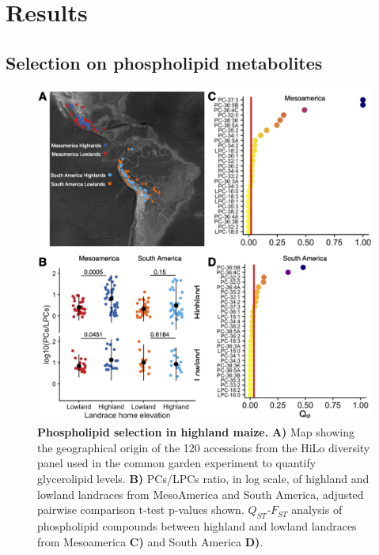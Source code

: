 \documentclass[9pt,twocolumn,twoside,lineno]{BioRxiv}
\begin{document}
\section{Results}
\label{sec:results}
\subsection{Selection on phospholipid metabolites}
\begin{figure}[hbp]
\begin{center}
\includegraphics[width=0.4\paperwidth]{Figures/Fig_1.png}
\caption{\textbf{Phospholipid selection in highland maize.} 
\textbf{A)} Map showing the geographical origin of the 120 accessions from the HiLo diversity panel used in the common garden experiment to quantify glycerolipid levels.
\textbf{B)} PCs/LPCs ratio, in log scale, of highland and lowland landraces from MesoAmerica and South America, adjusted pairwise comparison t-test p-values shown.
\textit{$Q_{ST}$-$F_{ST}$} analysis of phospholipid compounds between highland and lowland landraces from Mesoamerica \textbf{C)} and South America \textbf{D)}.
} 
\label{Fig1}
\end{center}
\end{figure}
\end{document}
